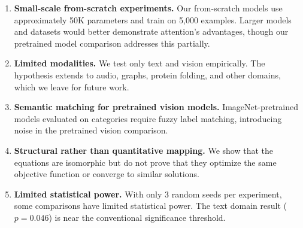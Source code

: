 \begin{enumerate}[leftmargin=*,itemsep=2pt,topsep=2pt]
    \item \textbf{Small-scale from-scratch experiments.} Our from-scratch models use approximately 50K parameters and train on 5{,}000 examples. Larger models and datasets would better demonstrate attention's advantages, though our pretrained model comparison addresses this partially.
    \item \textbf{Limited modalities.} We test only text and vision empirically. The hypothesis extends to audio, graphs, protein folding, and other domains, which we leave for future work.
    \item \textbf{Semantic matching for pretrained vision models.} ImageNet-pretrained models evaluated on \cifarten categories require fuzzy label matching, introducing noise in the pretrained vision comparison.
    \item \textbf{Structural rather than quantitative mapping.} We show that the equations are isomorphic but do not prove that they optimize the same objective function or converge to similar solutions.
    \item \textbf{Limited statistical power.} With only 3 random seeds per experiment, some comparisons have limited statistical power. The text domain result ($p{=}0.046$) is near the conventional significance threshold.
\end{enumerate}
